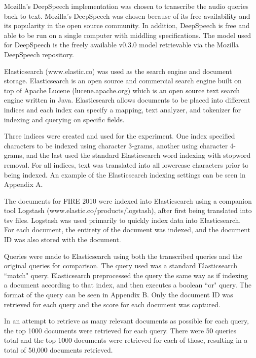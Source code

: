 \documentclass[jair, twoside,11pt,theapa]{article}
\begin{document}
Mozilla's DeepSpeech implementation was chosen to transcribe the audio queries back to text. Mozilla's DeepSpeech was chosen because of its free availability and its popularity in the open source community. In addition, DeepSpeech is free and able to be run on a single computer with middling specifications. The model used for DeepSpeech is the freely available v0.3.0 model retrievable via the Mozilla DeepSpeech repository.

Elasticsearch (www.elastic.co) was used as the search engine and document storage. Elasticsearch is an open source and commercial search engine built on top of Apache Lucene (lucene.apache.org) which is an open source text search engine written in Java. Elasticsearch allows documents to be placed into different indices and each index can specify a mapping, text analyzer, and tokenizer for indexing and querying on specific fields. 

Three indices were created and used for the experiment. One index specified characters to be indexed using character 3-grams, another using character 4-grams, and the last used the standard Elasticsearch word indexing with stopword removal. For all indices, text was translated into all lowercase characters prior to being indexed. An example of the Elasticsearch indexing settings can be seen in Appendix A. 

The documents for FIRE 2010 were indexed into Elasticsearch using a companion tool Logstash (www.elastic.co/products/logstash), after first being translated into tsv files. Logstash was used primarily to quickly index data into Elasticsearch. For each document, the entirety of the document was indexed, and the document ID was also stored with the document. 

Queries were made to Elasticsearch using both the transcribed queries and the original queries for comparison. The query used was a standard Elasticsearch ``match" query. Elasticsearch preprocessed the query the same way as if indexing a document according to that index, and then executes a boolean ``or" query. The format of the query can be seen in Appendix B. Only the document ID was retrieved for each query and the score for each document was captured. 

In an attempt to retrieve as many relevant documents as possible for each query, the top 1000 documents were retrieved for each query. There were 50 queries total and the top 1000 documents were retrieved for each of those, resulting in a total of 50,000 documents retrieved. 
\end{document}
